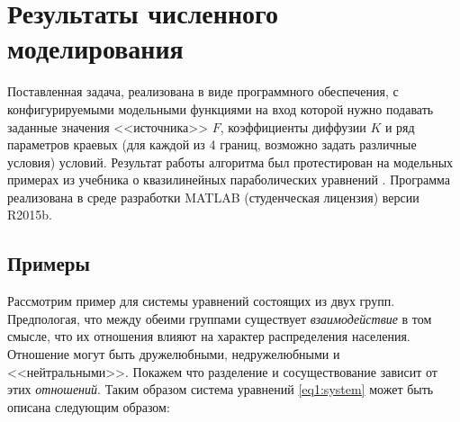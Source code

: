 \chapter{Результаты численного моделирования} \label{ch3:results}

Поставленная задача, реализована в виде программного обеспечения, с конфигурируемыми модельными функциями  
на вход которой нужно подавать заданные значения <<источника>> $F$, коэффициенты диффузии $K$ и ряд параметров краевых (для каждой из 4 границ, возможно задать различные условия) условий. Результат работы алгоритма был протестирован на модельных примерах из учебника о квазилинейных параболических уравнений \cite{Samarskiy1987}. Программа реализована в среде разработки MATLAB (студенческая лицензия) версии R2015b.

\section{Примеры}

Рассмотрим пример для системы уравнений состоящих из двух групп. Предпологая, что между обеими группами существует \textit{взаимодействие} в том смысле, что их отношения влияют на характер распределения населения. Отношение могут быть дружелюбными, недружелюбными и <<нейтральными>>. Покажем что разделение и сосуществование зависит от этих \textit{отношений}. Таким образом система уравнений \ref{eq1:system} может быть описана следующим образом:

